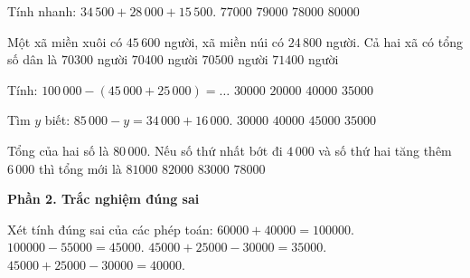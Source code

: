 \begin{ex} %
Tính nhanh: $34\,500 + 28\,000 + 15\,500$.
\choice
{$77000$}
{$79000$}
{\True $78000$}
{$80000$}
\end{ex}

\begin{ex} %
Một xã miền xuôi có $45\,600$ người, xã miền núi có $24\,800$ người. Cả hai xã có tổng số dân là
\choice
{$70300$ người}
{\True $70400$ người}
{$70500$ người}
{$71400$ người}
\end{ex}

\begin{ex} %
Tính: $100\,000 - (45\,000 + 25\,000) = \dots$
\choice
{\True $30000$}
{$20000$}
{$40000$}
{$35000$}
\end{ex}

\begin{ex} %
Tìm $y$ biết: $85\,000 - y = 34\,000 + 16\,000$.
\choice
{$30000$}
{$40000$}
{$45000$}
{\True $35000$}
\end{ex}

\begin{ex} %
Tổng của hai số là $80\,000$. Nếu số thứ nhất bớt đi $4\,000$ và số thứ hai tăng thêm $6\,000$ thì tổng mới là
\choice
{$81000$}
{\True $82000$}
{$83000$}
{$78000$}
\end{ex}

\textbf{Phần 2. Trắc nghiệm đúng sai}

\begin{ex} %
Xét tính đúng sai của các phép toán:
\choiceTF
{\True $60000 + 40000 = 100000$.}
{\True $100000 - 55000 = 45000$.}
{$45000 + 25000 - 30000 = 35000$.}
{\True $45000 + 25000 - 30000 = 40000$.}
\end{ex}

